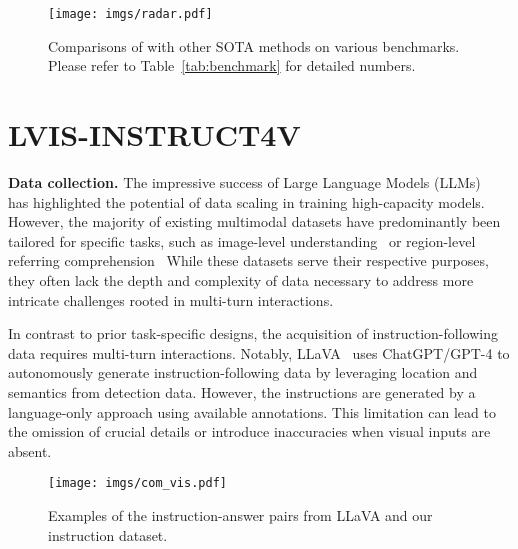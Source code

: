 \documentclass{article}
\newcommand{\fakeparagraph}[1]{\vspace{3mm}\noindent\textbf{#1}}
\begin{document}
\begin{figure}[t]
\centering
\texttt{[image: imgs/radar.pdf]}
\vspace{0.1in}
\caption{Comparisons of with other SOTA methods on various benchmarks. Please refer to Table~\ref{tab:benchmark} for detailed numbers.}
\label{fig:radar}
\end{figure} \section{LVIS-INSTRUCT4V}
\label{sec:method}

\fakeparagraph{Data collection.} The impressive success of Large Language Models (LLMs)~\cite{li2023blip,alayrac2022flamingo} has highlighted the potential of data scaling in training high-capacity models. However, the majority of existing multimodal datasets have predominantly been tailored for specific tasks, such as image-level understanding~\cite{cc,laion} or region-level referring comprehension~\cite{ref_coco,mdetr} While these datasets serve their respective purposes, they often lack the depth and complexity of data necessary to address more intricate challenges rooted in multi-turn interactions.

In contrast to prior task-specific designs, the acquisition of instruction-following data requires multi-turn interactions. Notably, LLaVA~\cite{liu2023visual} uses ChatGPT/GPT-4 to autonomously generate instruction-following data by leveraging location and semantics from detection data. However, the instructions are generated by a language-only approach using available annotations. This limitation can lead to the omission of crucial details or introduce inaccuracies when visual inputs are absent. 

\begin{figure}[t]
  \centering
  \texttt{[image: imgs/com\_vis.pdf]}
  \vspace{-0.2in}
  \caption{Examples of the instruction-answer pairs from LLaVA and our instruction dataset.}
  \label{fig:com_vis}
  \vspace{-0.25in}
\end{figure}
\end{document}
